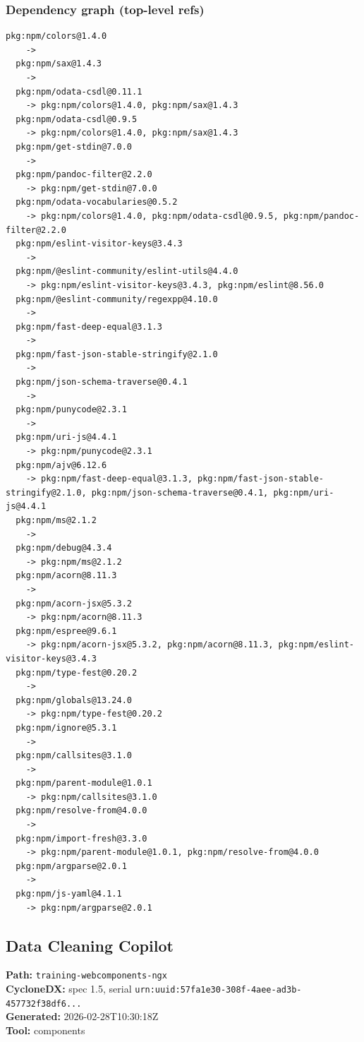 \documentclass[11pt,a4paper]{article}
\begin{document}
\subsubsection*{Dependency graph (top-level refs)}
\begin{lstlisting}[style=depgraph]
  pkg:npm/colors@1.4.0
    -> 
  pkg:npm/sax@1.4.3
    -> 
  pkg:npm/odata-csdl@0.11.1
    -> pkg:npm/colors@1.4.0, pkg:npm/sax@1.4.3
  pkg:npm/odata-csdl@0.9.5
    -> pkg:npm/colors@1.4.0, pkg:npm/sax@1.4.3
  pkg:npm/get-stdin@7.0.0
    -> 
  pkg:npm/pandoc-filter@2.2.0
    -> pkg:npm/get-stdin@7.0.0
  pkg:npm/odata-vocabularies@0.5.2
    -> pkg:npm/colors@1.4.0, pkg:npm/odata-csdl@0.9.5, pkg:npm/pandoc-filter@2.2.0
  pkg:npm/eslint-visitor-keys@3.4.3
    -> 
  pkg:npm/@eslint-community/eslint-utils@4.4.0
    -> pkg:npm/eslint-visitor-keys@3.4.3, pkg:npm/eslint@8.56.0
  pkg:npm/@eslint-community/regexpp@4.10.0
    -> 
  pkg:npm/fast-deep-equal@3.1.3
    -> 
  pkg:npm/fast-json-stable-stringify@2.1.0
    -> 
  pkg:npm/json-schema-traverse@0.4.1
    -> 
  pkg:npm/punycode@2.3.1
    -> 
  pkg:npm/uri-js@4.4.1
    -> pkg:npm/punycode@2.3.1
  pkg:npm/ajv@6.12.6
    -> pkg:npm/fast-deep-equal@3.1.3, pkg:npm/fast-json-stable-stringify@2.1.0, pkg:npm/json-schema-traverse@0.4.1, pkg:npm/uri-js@4.4.1
  pkg:npm/ms@2.1.2
    -> 
  pkg:npm/debug@4.3.4
    -> pkg:npm/ms@2.1.2
  pkg:npm/acorn@8.11.3
    -> 
  pkg:npm/acorn-jsx@5.3.2
    -> pkg:npm/acorn@8.11.3
  pkg:npm/espree@9.6.1
    -> pkg:npm/acorn-jsx@5.3.2, pkg:npm/acorn@8.11.3, pkg:npm/eslint-visitor-keys@3.4.3
  pkg:npm/type-fest@0.20.2
    -> 
  pkg:npm/globals@13.24.0
    -> pkg:npm/type-fest@0.20.2
  pkg:npm/ignore@5.3.1
    -> 
  pkg:npm/callsites@3.1.0
    -> 
  pkg:npm/parent-module@1.0.1
    -> pkg:npm/callsites@3.1.0
  pkg:npm/resolve-from@4.0.0
    -> 
  pkg:npm/import-fresh@3.3.0
    -> pkg:npm/parent-module@1.0.1, pkg:npm/resolve-from@4.0.0
  pkg:npm/argparse@2.0.1
    -> 
  pkg:npm/js-yaml@4.1.1
    -> pkg:npm/argparse@2.0.1
\end{lstlisting}

\subsection{Data Cleaning Copilot}
\textbf{Path:} \texttt{training-webcomponents-ngx}
\\ \textbf{CycloneDX:} spec 1.5, serial \texttt{urn:uuid:57fa1e30-308f-4aee-ad3b-457732f38df6...}
\\ \textbf{Generated:} 2026-02-28T10:30:18Z
\\ \textbf{Tool:} components
\end{document}
